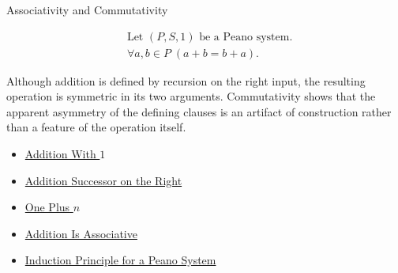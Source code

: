 \begin{topicbox}{Associativity and Commutativity}
\begin{remark*}
\[
\begin{aligned}
&\text{Let } (P,S,1) \text{ be a Peano system.}\\
&\forall a,b \in P\;(a+b=b+a).
\end{aligned}
\]
\end{remark*}

\begin{remark*}[Interpretation]
Although addition is defined by recursion on the right input, the resulting
operation is symmetric in its two arguments. Commutativity shows that the
apparent asymmetry of the defining clauses is an artifact of construction
rather than a feature of the operation itself.
\end{remark*}

\begin{dependencies}
\begin{itemize}
  \item \hyperref[thm:addition-with-one]{Addition With $1$}
  \item \hyperref[thm:addition-successor-on-right]{Addition Successor on the Right}
  \item \hyperref[thm:one-plus-n]{One Plus $n$}
  \item \hyperref[thm:addition-associative]{Addition Is Associative}
  \item \hyperref[thm:induction-principle-for-peano-system]{Induction Principle for a Peano System}
\end{itemize}
\end{dependencies}
\end{topicbox}

